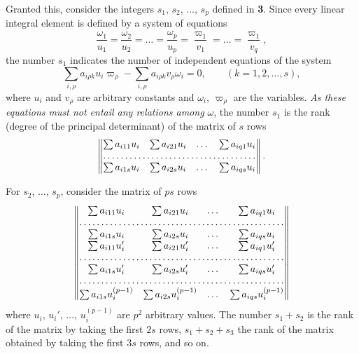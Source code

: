 \documentclass[leqno,11pt]{book}
\theoremstyle{shape1}
\theoremstyle{shapesmall}
\newcommand{\vp}{\varpi}
\begin{document}
Granted this, consider the integers $s_{1}$, $s_{2}$, $\dots$, $s_{p}$ defined in \textsection\textbf{3}. Since every linear integral element is defined by a system of equations
\begin{equation}
  \label{eq:p12}
  \frac{\omega_{1}}{u_{1}}=\frac{\omega_{2}}{u_{2}}=\dots=\frac{\omega_{p}}{u_{p}}=\frac{\vp_{1}}{v_{1}}=\dots=\frac{\vp_{1}}{v_{q}},
\end{equation}
the number $s_{1}$ indicates the number of independent equations of the system
\begin{equation}
  \label{eq:p13}
  \sum_{i,\rho}a_{i\rho k}u_{i}\vp_{\rho}-\sum_{i,\rho}a_{i\rho k}v_{\rho}\omega_{i}=0,\qquad(k=1,2,\dots,s),
\end{equation}
where $u_{i}$ and $v_{\rho}$ are arbitrary constants and $\omega_{i}$, $\vp_{\rho}$ are the variables. \emph{As these equations must not entail any relations among $\omega$}, the number $s_{1}$ is the rank (degree of the principal determinant) of the matrix of $s$ rows
\[
\begin{Vmatrix}
  \sum a_{i11}u_{i}&\sum a_{i21}u_{i}&\dots&\sum a_{iq1}u_{i}\\
  \hdotsfor{4}\\
  \sum a_{i1s}u_{i}&\sum a_{i2s}u_{i}&\dots&\sum a_{iqs}u_{i}  
\end{Vmatrix}.
\]

For $s_{2}$, $\dots$, $s_{p}$, consider the matrix of $ps$ rows
\begin{equation}
  \label{eq:p14}
\begin{Vmatrix}
  \sum a_{i11}u_{i}&\sum a_{i21}u_{i}&\dots&\sum a_{iq1}u_{i}\\
  \hdotsfor{4}\\
  \sum a_{i1s}u_{i}&\sum a_{i2s}u_{i}&\dots&\sum a_{iqs}u_{i}\\
  \sum a_{i11}u'_{i}&\sum a_{i21}u'_{i}&\dots&\sum a_{iq1}u'_{i}\\
  \hdotsfor{4}\\
  \sum a_{i1s}u'_{i}&\sum a_{i2s}u'_{i}&\dots&\sum a_{iqs}u'_{i}\\
  \hdotsfor{4}\\
  \sum a_{i1s}u^{(p-1)}_{i}&\sum a_{i2s}u^{(p-1)}_{i}&\dots&\sum a_{iqs}u^{(p-1)}_{i}  
\end{Vmatrix} 
\end{equation}
where $u_{i}$, $u_{i}'$, $\dots$, $u_{i}^{(p-1)}$ are $p^{2}$ arbitrary values. The number $s_{1}+s_{2}$ is the rank of the matrix by taking the first $2s$ rows, $s_{1}+s_{2}+s_{3}$ the rank of the matrix obtained by taking the first $3s$ rows, and so on.
\end{document}
